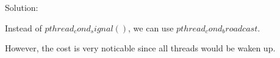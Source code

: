     Solution: 

    Instead of \textbf{$pthread_cond_signal()$}, we can use \textbf{$pthread_cond_broadcast$}.

    However, the cost is very noticable since all threads would be waken up.
    

























